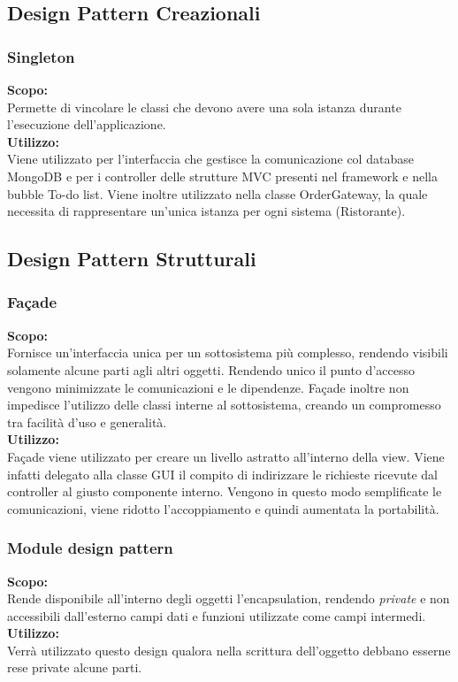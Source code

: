 \subsection{Design Pattern Creazionali}

\subsubsection{Singleton}
\textbf{Scopo:} \\
Permette di vincolare le classi che devono avere una sola istanza durante l'esecuzione dell'applicazione.\\
\textbf{Utilizzo:} \\
Viene utilizzato per l'interfaccia che gestisce la comunicazione col database MongoDB e per i controller delle strutture MVC presenti nel framework e nella bubble To-do list. Viene inoltre utilizzato nella classe Order\-Gateway, la quale necessita di rappresentare un'unica istanza per ogni sistema (Ristorante).

\subsection{Design Pattern Strutturali}

\subsubsection{Fa\c{c}ade}
\textbf{Scopo:} \\
Fornisce un'interfaccia unica per un sottosistema più complesso, rendendo visibili solamente alcune parti agli altri oggetti. Rendendo unico il punto d'accesso vengono minimizzate le comunicazioni e le dipendenze. Fa\c{c}ade inoltre non impedisce l'utilizzo delle classi interne al sottosistema, creando un compromesso tra facilità d'uso e generalità. \\
\textbf{Utilizzo:} \\ 
Fa\c{c}ade viene utilizzato per creare un livello astratto all'interno della view. Viene infatti delegato alla classe GUI il compito di indirizzare le richieste ricevute dal controller al giusto componente interno. Vengono in questo modo semplificate le comunicazioni, viene ridotto l'accoppiamento e quindi aumentata la portabilità. 

\subsubsection{Module design pattern}
\textbf{Scopo:} \\
Rende disponibile all'interno degli oggetti l'encapsulation, rendendo \textit{private} e non accessibili dall'esterno campi dati e funzioni utilizzate come campi intermedi.\\
\textbf{Utilizzo:} \\
Verrà utilizzato questo design qualora nella scrittura dell'oggetto debbano esserne rese private alcune parti.

